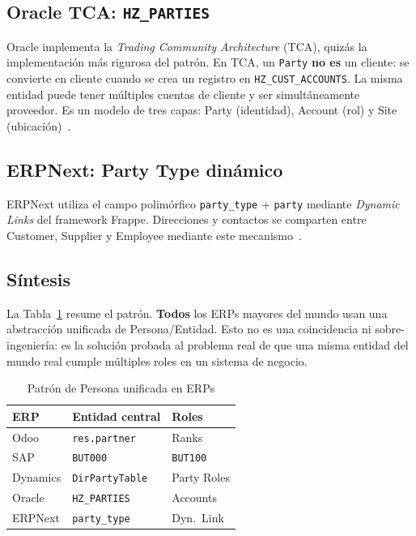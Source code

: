\documentclass[conference]{IEEEtran}
\begin{document}
\subsection{Oracle TCA: \texttt{HZ\_PARTIES}}

Oracle implementa la \textit{Trading Community Architecture}
(TCA), quiz\'as la implementaci\'on m\'as rigurosa del patr\'on.
En TCA, un \texttt{Party} \textbf{no es} un cliente: se convierte
en cliente cuando se crea un registro en
\texttt{HZ\_CUST\_ACCOUNTS}. La misma entidad puede tener
m\'ultiples cuentas de cliente y ser simult\'aneamente proveedor.
Es un modelo de tres capas: Party (identidad), Account (rol) y
Site (ubicaci\'on)~\cite{oracle_tca}.

\subsection{ERPNext: Party Type din\'amico}

ERPNext utiliza el campo polim\'orfico \texttt{party\_type} +
\texttt{party} mediante \textit{Dynamic Links} del framework
Frappe. Direcciones y contactos se comparten entre Customer,
Supplier y Employee mediante este mecanismo~\cite{erpnext_party}.

\subsection{S\'intesis}

La Tabla~\ref{tab:erps} resume el patr\'on. \textbf{Todos} los
ERPs mayores del mundo usan una abstracci\'on unificada de
Persona/Entidad. Esto no es una coincidencia ni
sobre-ingenier\'ia: es la soluci\'on probada al problema real de
que una misma entidad del mundo real cumple m\'ultiples roles en
un sistema de negocio.

\begin{table}[H]
\centering
\caption{Patr\'on de Persona unificada en ERPs}
\label{tab:erps}
\small
\begin{tabularx}{\columnwidth}{l >{\raggedright\arraybackslash}X l}
\toprule
\textbf{ERP} & \textbf{Entidad central} & \textbf{Roles} \\
\midrule
Odoo & \texttt{res.partner} & Ranks \\
SAP & \texttt{BUT000} & \texttt{BUT100} \\
Dynamics & \texttt{DirPartyTable} & Party Roles \\
Oracle & \texttt{HZ\_PARTIES} & Accounts \\
ERPNext & \texttt{party\_type} & Dyn.\ Link \\
\bottomrule
\end{tabularx}
\end{table}
\end{document}
